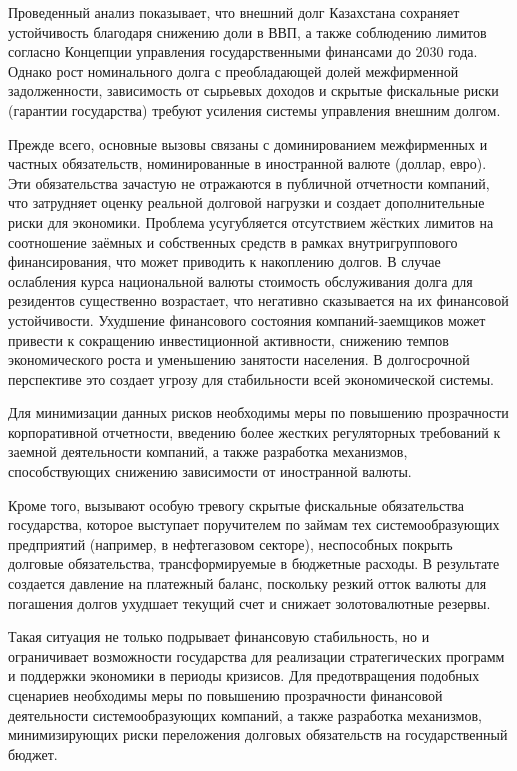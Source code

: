 \begin{multicols}{2}
Проведенный анализ показывает, что внешний долг Казахстана сохраняет
устойчивость благодаря снижению доли в ВВП, а также соблюдению лимитов
согласно Концепции управления государственными финансами до 2030 года.
Однако рост номинального долга с преобладающей долей межфирменной
задолженности, зависимость от сырьевых доходов и скрытые фискальные
риски (гарантии государства) требуют усиления системы управления внешним
долгом.

Прежде всего, основные вызовы связаны с доминированием межфирменных и
частных обязательств, номинированные в иностранной валюте (доллар,
евро). Эти обязательства зачастую не отражаются в публичной отчетности
компаний, что затрудняет оценку реальной долговой нагрузки и создает
дополнительные риски для экономики. Проблема усугубляется отсутствием
жёстких лимитов на соотношение заёмных и собственных средств в рамках
внутригруппового финансирования, что может приводить к накоплению
долгов. В случае ослабления курса национальной валюты стоимость
обслуживания долга для резидентов существенно возрастает, что негативно
сказывается на их финансовой устойчивости. Ухудшение финансового
состояния компаний-заемщиков может привести к сокращению инвестиционной
активности, снижению темпов экономического роста и уменьшению занятости
населения. В долгосрочной перспективе это создает угрозу для
стабильности всей экономической системы.

Для минимизации данных рисков необходимы меры по повышению прозрачности
корпоративной отчетности, введению более жестких регуляторных требований
к заемной деятельности компаний, а также разработка механизмов,
способствующих снижению зависимости от иностранной валюты.

Кроме того, вызывают особую тревогу скрытые фискальные обязательства
государства, которое выступает поручителем по займам тех
системообразующих предприятий (например, в нефтегазовом секторе),
неспособных покрыть долговые обязательства, трансформируемые в бюджетные
расходы. В результате создается давление на платежный баланс, поскольку
резкий отток валюты для погашения долгов ухудшает текущий счет и снижает
золотовалютные резервы.

Такая ситуация не только подрывает финансовую стабильность, но и
ограничивает возможности государства для реализации стратегических
программ и поддержки экономики в периоды кризисов. Для предотвращения
подобных сценариев необходимы меры по повышению прозрачности финансовой
деятельности системообразующих компаний, а также разработка механизмов,
минимизирующих риски переложения долговых обязательств на
государственный бюджет.


\end{multicols}
